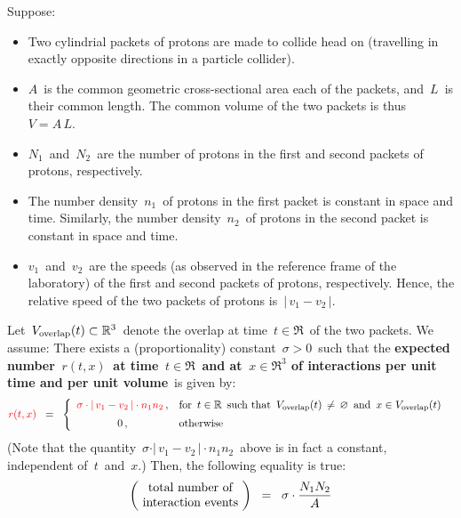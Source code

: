 \begin{lemma}
\mbox{}
\vskip 0.01cm
\noindent
Suppose:
\begin{itemize}
\item
    Two cylindrial packets of protons are made to collide head on
    (travelling in exactly opposite directions in a particle collider).
\item
    $A$\, is the common geometric cross-sectional area each of the packets,
    and
    \,$L$\, is their common length.
    The common volume of the two packets is thus \,$V = A\,L$.\,
\item
    $N_{1}$\, and \,$N_{2}$\, are the number of protons 
    in the first and second packets of protons, respectively.
\item
    The number density \,$n_{1}$\, of protons in the first packet is constant in space and time.
    Similarly,
    the number density \,$n_{2}$\, of protons in the second packet is constant in space and time.
\item
    $v_{1}$\, and \,$v_{2}$\, are the speeds (as observed in the reference frame of the laboratory)
    of the first and second packets of protons, respectively.
    Hence, the relative speed of the two packets of protons is
    \,$\vert\,v_{1} - v_{2}\,\vert$.\,
\end{itemize}
Let
\,$V_{\textnormal{overlap}}(t) \subset \Re^{3}$\,
denote the overlap at time \,$t \in \Re$\, of the two packets.
\vskip 0.2cm
\noindent
\!We assume:
There exists a
{\color{red}(proportionality) constant \,$\sigma > 0$\,}
such that the
\textbf{expected number \,$r(t,x)$\, at time \,$t \in \Re$\, and at \,$x \in \Re^{3}$
of interactions per unit time and per unit volume}\,
is given by:
\begin{equation*}
{\color{red}r(t,x)}
\;\; = \;\;
    \left\{\begin{array}{cl}
        {\color{red}\sigma \cdot \vert\,v_{1} - v_{2}\,\vert \cdot n_{1} n_{2}}\,,
        &
        \textnormal{for \,$t \in \Re$\, such that
            \,$V_{\textnormal{overlap}}(t) \,\neq\, \varemptyset$\,
            and \,$x \in V_{\textnormal{overlap}}(t)$\,
            }
        \\
        \overset{{\color{white}1}}{0}\,,
        &
        \textnormal{otherwise}
        \end{array}\right.
\end{equation*}
(Note that the quantity
\,$\sigma \cdot \vert\,v_{1} - v_{2}\,\vert \cdot n_{1} n_{2}$\,
above is in fact a constant, independent of \,$t$\, and \,$x$.)
\vskip 0.2cm
\noindent
Then, the following equality is true:
\begin{equation*}
\left(\!\begin{array}{c}
    \textnormal{total number of}
    \\
    \textnormal{interaction events}
    \end{array}\!\right)
\;\; = \;\;
    \sigma \cdot \dfrac{ N_{1} N_{2} }{A}
\end{equation*}
\end{lemma}
